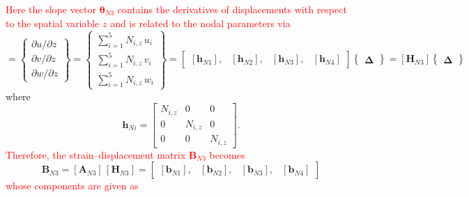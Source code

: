 \textcolor{red}{Here the slope vector $\boldsymbol{\theta}_{N3}$ contains the derivatives of displacements with respect to the spatial variable $z$ and is related to the nodal parameters via}
\begin{equation}
[\boldsymbol{\theta}_{N3}] =  \begin{Bmatrix}
\partial u / \partial z\\
\partial v / \partial z \\
\partial w / \partial z
\end{Bmatrix}
= \begin{Bmatrix}
\sum\nolimits_{i=1}^5 N_{i,z} \, u_i\\
\sum\nolimits_{i=1}^5 N_{i,z} \, v_i \\
\sum\nolimits_{i=1}^5 N_{i,z} \, w_i
\end{Bmatrix} 
= \begin{bmatrix}
[\mathbf{h}_{N1}], & [\mathbf{h}_{N2}], & [\mathbf{h}_{N3}], & [\mathbf{h}_{N4}] 
\end{bmatrix}  \begin{Bmatrix} \boldsymbol{\Delta} \end{Bmatrix}  
= [\mathbf{H}_{N3}] \begin{Bmatrix} \boldsymbol{\Delta} \end{Bmatrix} 
\end{equation}
where 
\begin{equation}
\mathbf{h}_{Ni} = \begin{bmatrix}
N_{i,z} &  0 & 0  \\
0 & N_{i,z} & 0  \\
0 & 0 & N_{i,z} \end{bmatrix}. 
\end{equation}
\textcolor{red}{Therefore, the strain--displacement matrix $\mathbf{B}_{N3}$ becomes}
\begin{equation}
\mathbf{B}_{N3} = [\mathbf{A}_{N3}] \, [\mathbf{H}_{N3}] = \begin{bmatrix}
[\mathbf{b}_{N1}], & [\mathbf{b}_{N2}], & [\mathbf{b}_{N3}], & [\mathbf{b}_{N4}]
\end{bmatrix} 
\end{equation}
\textcolor{red}{whose components are given as}
